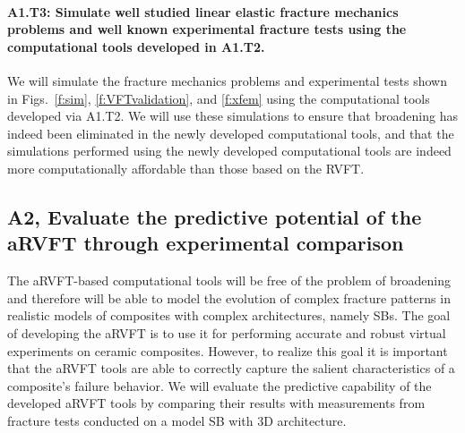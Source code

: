 \documentclass[10pt,letterpaper]{article}
\begin{document}
   \paragraph{A1.T3: Simulate well studied linear elastic fracture mechanics problems and well known  experimental  fracture tests using the  computational tools developed in A1.T2.}
We will simulate the  fracture mechanics problems and experimental tests shown in Figs.~\ref{f:sim}, \ref{f:VFTvalidation},  and \ref{f:xfem} using the  computational tools developed via A1.T2.
We will use these simulations to ensure that broadening has indeed  been eliminated in the newly developed computational tools,  and that the  simulations performed using  the newly developed computational tools are indeed more computationally affordable than those based on the RVFT. %


  \subsection{A2, Evaluate the predictive potential of the aRVFT through experimental comparison}
    \label{s:A2}

    The aRVFT-based computational tools will be free of the problem of broadening and therefore will be able to model the evolution of complex fracture patterns in realistic models of composites with complex architectures, namely SBs.
    The goal of developing the aRVFT is to use it for performing accurate and robust virtual experiments on ceramic composites.
    However, to realize this goal it is important that the aRVFT tools are able to correctly capture the salient characteristics of a composite's failure behavior. We will evaluate the predictive capability of the developed aRVFT tools by comparing their results with measurements from fracture tests conducted on a model SB with 3D architecture.
\end{document}
